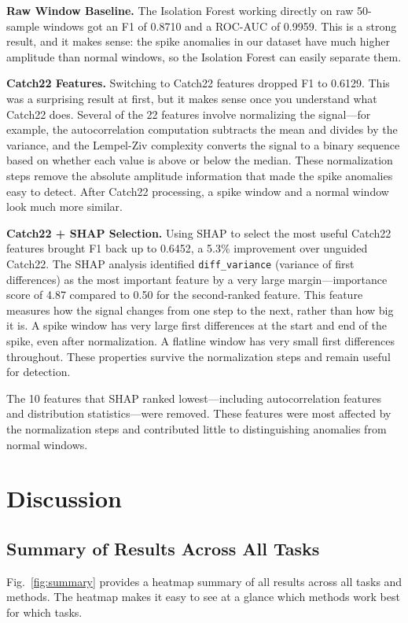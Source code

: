 \documentclass[10pt,conference]{IEEEtran}
\begin{document}
\textbf{Raw Window Baseline.} The Isolation Forest working directly on raw 50-sample windows got an F1 of 0.8710 and a ROC-AUC of 0.9959. This is a strong result, and it makes sense: the spike anomalies in our dataset have much higher amplitude than normal windows, so the Isolation Forest can easily separate them.

\textbf{Catch22 Features.} Switching to Catch22 features dropped F1 to 0.6129. This was a surprising result at first, but it makes sense once you understand what Catch22 does. Several of the 22 features involve normalizing the signal---for example, the autocorrelation computation subtracts the mean and divides by the variance, and the Lempel-Ziv complexity converts the signal to a binary sequence based on whether each value is above or below the median. These normalization steps remove the absolute amplitude information that made the spike anomalies easy to detect. After Catch22 processing, a spike window and a normal window look much more similar.

\textbf{Catch22 + SHAP Selection.} Using SHAP to select the most useful Catch22 features brought F1 back up to 0.6452, a 5.3\% improvement over unguided Catch22. The SHAP analysis identified \texttt{diff\_variance} (variance of first differences) as the most important feature by a very large margin---importance score of 4.87 compared to 0.50 for the second-ranked feature. This feature measures how the signal changes from one step to the next, rather than how big it is. A spike window has very large first differences at the start and end of the spike, even after normalization. A flatline window has very small first differences throughout. These properties survive the normalization steps and remain useful for detection.

The 10 features that SHAP ranked lowest---including autocorrelation features and distribution statistics---were removed. These features were most affected by the normalization steps and contributed little to distinguishing anomalies from normal windows.

\section{Discussion}

\subsection{Summary of Results Across All Tasks}

Fig.~\ref{fig:summary} provides a heatmap summary of all results across all tasks and methods. The heatmap makes it easy to see at a glance which methods work best for which tasks.
\end{document}
